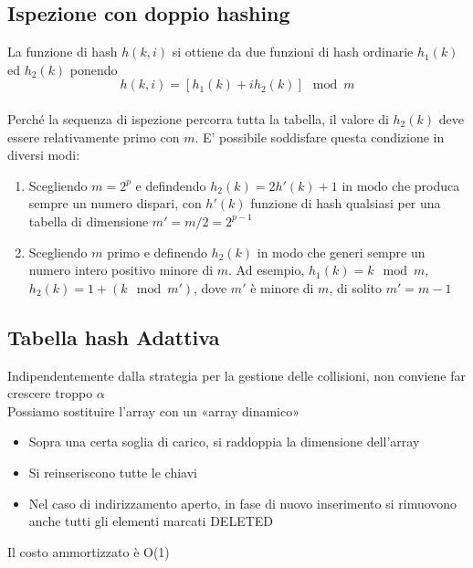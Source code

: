 \subsection{Ispezione con doppio hashing}
La funzione di hash $h(k,i)$ si ottiene da due funzioni di hash ordinarie $h_1(k)$ ed 
$h_2(k)$ ponendo\\
$$ h(k,i)=[h_1(k)+ih_2 (k)]\mod m $$\\
Perché la sequenza di ispezione percorra tutta la tabella, il valore di $h_2 (k)$ deve
essere relativamente primo con $m$. E' possibile soddisfare questa condizione in diversi modi:\\
\begin{enumerate}
    \item Scegliendo $m=2^p$ e defindendo $h_2(k)=2h'(k)+1$ in modo che produca sempre un numero 
    dispari, con $h'(k)$ funzione di hash qualsiasi per una tabella di dimensione $m'=m/2=2^{p-1}$
    \item Scegliendo $m$ primo e definendo $h_2(k)$ in modo che generi sempre un numero 
    intero positivo minore di $m$. Ad esempio, $h_1(k)=k \mod m$, $h_2(k)=1+(k \mod m')$, dove $m'$ 
    è minore di $m$, di solito $m'=m-1$
\end{enumerate}

\subsection{Tabella hash Adattiva}
Indipendentemente dalla strategia per la gestione delle collisioni, non conviene
far crescere troppo $\alpha$\\
Possiamo sostituire l’array con un «array dinamico»
\begin{itemize}
    \item Sopra una certa soglia di carico, si raddoppia la dimensione dell’array
    \item Si reinseriscono tutte le chiavi
    \item Nel caso di indirizzamento aperto, in fase di nuovo inserimento si rimuovono anche tutti gli elementi marcati DELETED
\end{itemize}
\noindent Il costo ammortizzato è O(1)
